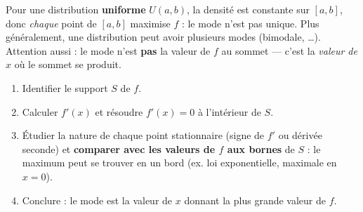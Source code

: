 \documentclass[11pt]{article}
\begin{document}
\begin{attention}
Pour une distribution \textbf{uniforme} $U(a,b)$, la densité est constante sur $[a,b]$, donc \emph{chaque} point de $[a,b]$ maximise $f$ : le mode n'est pas unique. Plus généralement, une distribution peut avoir plusieurs modes (bimodale, \dots). Attention aussi : le mode n'est \textbf{pas} la valeur de $f$ au sommet — c'est la \emph{valeur de $x$} où le sommet se produit.
\end{attention}

\begin{methode}
\begin{enumerate}
\item Identifier le support $S$ de $f$.
\item Calculer $f'(x)$ et résoudre $f'(x)=0$ à l'intérieur de $S$.
\item Étudier la nature de chaque point stationnaire (signe de $f'$ ou dérivée seconde) et \textbf{comparer avec les valeurs de $f$ aux bornes} de $S$ : le maximum peut se trouver en un bord (ex. loi exponentielle, maximale en $x=0$).
\item Conclure : le mode est la valeur de $x$ donnant la plus grande valeur de $f$.
\end{enumerate}
\end{methode}
\end{document}

